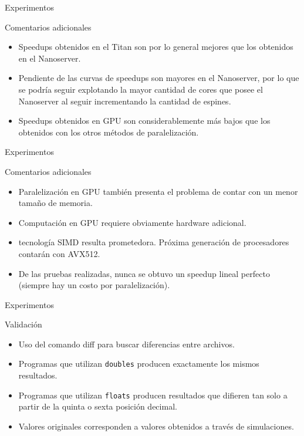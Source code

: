 \begin{frame}{Experimentos}
\begin{block}{Comentarios adicionales}

\begin{itemize}
  \item Speedups obtenidos en el Titan son por lo general mejores que los obtenidos en el Nanoserver.
  \item Pendiente de las curvas de speedups son mayores en el Nanoserver, por lo que se podría seguir explotando la mayor cantidad de cores que posee el Nanoserver al seguir incrementando la cantidad de espines.
  \item Speedups obtenidos en GPU son considerablemente más bajos que los obtenidos con los otros métodos de paralelización.
\end{itemize}
\end{block}
\end{frame}

\begin{frame}{Experimentos}
\begin{block}{Comentarios adicionales}

\begin{itemize}
  \item Paralelización en GPU también presenta el problema de contar con un menor tamaño de memoria.
  \item Computación en GPU requiere obviamente hardware adicional.
  \item tecnología SIMD resulta prometedora. Próxima generación de procesadores contarán con AVX512.
  \item De las pruebas realizadas, nunca se obtuvo un speedup lineal perfecto (siempre hay un costo por paralelización).
\end{itemize}
\end{block}
\end{frame}
\begin{frame}{Experimentos}
\begin{block}{Validación}

\begin{itemize}
  \item Uso del comando diff para buscar diferencias entre archivos.
  \item Programas que utilizan \texttt{doubles} producen exactamente los mismos resultados.
  \item Programas que utilizan \texttt{floats} producen resultados que difieren tan solo a partir de la quinta o sexta posición decimal.
  \item Valores originales corresponden a valores obtenidos a través de simulaciones.
\end{itemize}
\end{block}
\end{frame}